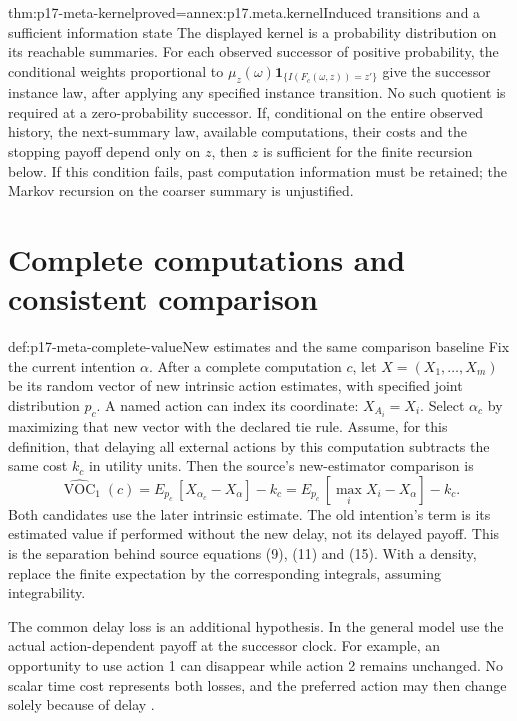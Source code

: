 \begin{hblemma}{thm:p17-meta-kernel}{proved=annex:p17.meta.kernel}{Induced transitions and a sufficient information state}
The displayed kernel is a probability distribution on its reachable
summaries. For each observed successor of positive probability, the
conditional weights proportional to
\(\mu_z(\omega)\mathbf1_{\{I(F_c(\omega,z))=z'\}}\)
give the successor instance law, after applying any specified instance
transition. No such quotient is required at a zero-probability successor.
If, conditional on the entire observed history, the next-summary law,
available computations, their costs and the stopping payoff depend only
on \(z\), then \(z\) is sufficient for the finite recursion below.
If this condition fails, past computation information must be retained;
the Markov recursion on the coarser summary is unjustified.
\end{hblemma}

\section{Complete computations and consistent comparison}
\label{sec:p17-meta-complete}

\begin{hbdefinition}{def:p17-meta-complete-value}{New estimates and the same comparison baseline}
Fix the current intention \(\alpha\). After a complete computation
\(c\), let \(X=(X_1,\ldots,X_m)\) be its random vector of
new intrinsic action estimates, with specified joint distribution
\(p_c\). A named action can index its coordinate: \(X_{A_i}=X_i\).
Select \(\alpha_c\) by maximizing that new vector with
the declared tie rule. Assume, for this definition, that delaying all
external actions by this computation subtracts the same cost \(k_c\)
in utility units. Then the source's new-estimator comparison is
\[
 \widehat{\operatorname{VOC}}_1(c)
   =E_{p_c}\,[X_{\alpha_c}-X_\alpha]-k_c
   =E_{p_c}\,[\max_i X_i-X_\alpha]-k_c.
\]
Both candidates use the later intrinsic estimate. The old intention's
term is its estimated value if performed without the new delay, not
its delayed payoff. This is the separation behind source equations
(9), (11) and (15). With a density, replace the finite expectation by
the corresponding integrals, assuming integrability.

The common delay loss is an additional hypothesis. In the general
model use the actual action-dependent payoff at the successor clock.
For example, an opportunity to use action 1 can disappear while action 2
remains unchanged. No scalar time cost represents both losses, and
the preferred action may then change solely because of delay
\cite[\S\S4.1--4.3, pp.~404--406]{RussellWefald1989KRMetareasoning}.
\end{hbdefinition}

